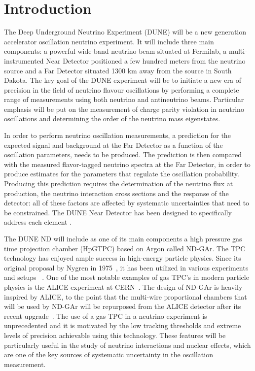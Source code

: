 \begin{savequote}[8cm]
\end{savequote}

\chapter*{\label{ch:1-intro}Introduction} 
\minitoc

The Deep Underground Neutrino Experiment (DUNE) \cite{DUNE:2020TDR1} will be a new generation accelerator oscillation neutrino experiment. It will include three main components: a powerful wide-band neutrino beam situated at Fermilab, a multi-instrumented Near Detector positioned a few hundred meters from the neutrino source and a Far Detector situated 1300 km away from the source in South Dakota. The key goal of the DUNE experiment will be to initiate a new era of precision in the field of neutrino flavour oscillations by performing a complete range of measurements using both neutrino and antineutrino beams. Particular emphasis will be put on the measurement of charge parity violation in neutrino oscillations and determining the order of the neutrino mass eigenstates.

In order to perform neutrino oscillation measurements, a prediction for the expected signal and background at the Far Detector as a function of the oscillation parameters, needs to be produced. The prediction is then compared with the measured flavor-tagged neutrino spectra at the Far Detector,
in order to produce estimates for the parameters that regulate the oscillation probability. Producing this prediction requires the determination of the neutrino flux at production, the neutrino interaction cross sections and the response of the detector: all of these factors are affected by systematic uncertainties that need to be constrained. The DUNE Near Detector has been designed to specifically
address each element \cite{DUNE:2021NDCDR}.

The DUNE ND will include as one of its main components a high pressure gas time projection chamber (HpGTPC) based on Argon called ND-GAr. The TPC technology has enjoyed ample success in high-energy particle physics. Since its original proposal by Nygren in 1975~\cite{NygrenTPC}, it has been utilized in various experiments and setups ~\cite{ATTIE200989,Hilke:2010zz}. One of the most notable examples of gas TPC's in modern particle physics is the ALICE experiment at CERN~\cite{ALICE:2008ngc}. The design of ND-GAr is heavily inspired by ALICE, to the point that the multi-wire proportional chambers that will be used by ND-GAr will be repurposed from the ALICE detector after its recent upgrade~\cite{ALICE:2023udb}. The use of a gas TPC in a neutrino experiment is unprecedented and it is motivated by the low tracking thresholds and extreme levels of precision achievable using this technology. These features will be particularly useful in the study of neutrino interactions and nuclear effects, which are one of the key sources of systematic uncertainty in the oscillation measurement.

